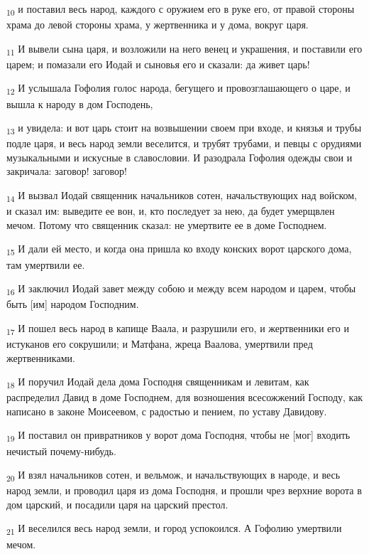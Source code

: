 \begin{tcolorbox}
\textsubscript{10} и поставил весь народ, каждого с оружием его в руке его, от правой стороны храма до левой стороны храма, у жертвенника и у дома, вокруг царя.
\end{tcolorbox}
\begin{tcolorbox}
\textsubscript{11} И вывели сына царя, и возложили на него венец и украшения, и поставили его царем; и помазали его Иодай и сыновья его и сказали: да живет царь!
\end{tcolorbox}
\begin{tcolorbox}
\textsubscript{12} И услышала Гофолия голос народа, бегущего и провозглашающего о царе, и вышла к народу в дом Господень,
\end{tcolorbox}
\begin{tcolorbox}
\textsubscript{13} и увидела: и вот царь стоит на возвышении своем при входе, и князья и трубы подле царя, и весь народ земли веселится, и трубят трубами, и певцы с орудиями музыкальными и искусные в славословии. И разодрала Гофолия одежды свои и закричала: заговор! заговор!
\end{tcolorbox}
\begin{tcolorbox}
\textsubscript{14} И вызвал Иодай священник начальников сотен, начальствующих над войском, и сказал им: выведите ее вон, и, кто последует за нею, да будет умерщвлен мечом. Потому что священник сказал: не умертвите ее в доме Господнем.
\end{tcolorbox}
\begin{tcolorbox}
\textsubscript{15} И дали ей место, и когда она пришла ко входу конских ворот царского дома, там умертвили ее.
\end{tcolorbox}
\begin{tcolorbox}
\textsubscript{16} И заключил Иодай завет между собою и между всем народом и царем, чтобы быть [им] народом Господним.
\end{tcolorbox}
\begin{tcolorbox}
\textsubscript{17} И пошел весь народ в капище Ваала, и разрушили его, и жертвенники его и истуканов его сокрушили; и Матфана, жреца Ваалова, умертвили пред жертвенниками.
\end{tcolorbox}
\begin{tcolorbox}
\textsubscript{18} И поручил Иодай дела дома Господня священникам и левитам, как распределил Давид в доме Господнем, для возношения всесожжений Господу, как написано в законе Моисеевом, с радостью и пением, по уставу Давидову.
\end{tcolorbox}
\begin{tcolorbox}
\textsubscript{19} И поставил он привратников у ворот дома Господня, чтобы не [мог] входить нечистый почему-нибудь.
\end{tcolorbox}
\begin{tcolorbox}
\textsubscript{20} И взял начальников сотен, и вельмож, и начальствующих в народе, и весь народ земли, и проводил царя из дома Господня, и прошли чрез верхние ворота в дом царский, и посадили царя на царский престол.
\end{tcolorbox}
\begin{tcolorbox}
\textsubscript{21} И веселился весь народ земли, и город успокоился. А Гофолию умертвили мечом.
\end{tcolorbox}
